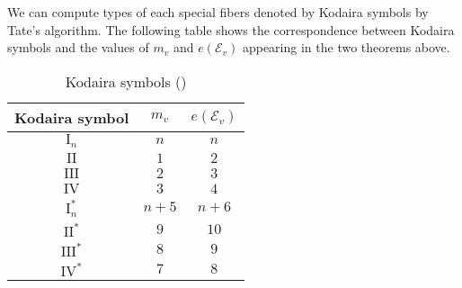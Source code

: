 \documentclass[main]{subfiles}
\begin{document}
We can compute types of each special fibers denoted by Kodaira symbols by Tate's algorithm.
The following table shows the correspondence between Kodaira symbols and the values of $m_v$ and $e(\mathcal{E}_v)$ appearing in the two theorems above.

\begin{table}[H]
    \centering
    \caption{Kodaira symbols (\cite[pp.136-137 付録2]{ref:shioda1993})}
    \begin{tabular}{|c|c|c|}
        \hline
        Kodaira symbol & $m_v$ & $e(\mathcal{E}_v)$ \\
        \hline
        $\mathrm{I}_n$   & $n$   & $n$                \\
        $\mathrm{II}$    & $1$   & $2$                \\
        $\mathrm{III}$   & $2$   & $3$                \\
        $\mathrm{IV}$    & $3$   & $4$                \\
        $\mathrm{I}_n^*$ & $n+5$ & $n+6$              \\
        $\mathrm{II}^*$  & $9$   & $10$               \\
        $\mathrm{III}^*$ & $8$   & $9$                \\
        $\mathrm{IV}^*$  & $7$   & $8$                \\
        \hline
    \end{tabular}
    \label{tab:kodaira}
\end{table}
\end{document}
